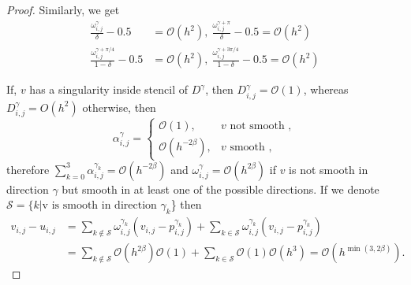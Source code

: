 \begin{proof}
Similarly, we get
$$
\begin{aligned}
\frac{\omega_{i,j}^\gamma}{\delta}-0.5&=\mathcal{O}\left(h^2\right),\:
\frac{\omega_{i,j}^{\gamma+\pi}}{\delta}-0.5=\mathcal{O}\left(h^2\right)\\
\frac{\omega_{i,j}^{\gamma+\pi/4}}{1-\delta}-0.5&=\mathcal{O}\left(h^2\right),\:
\frac{\omega_{i,j}^{\gamma+3\pi/4}}{1-\delta}-0.5=\mathcal{O}\left(h^2\right)
\end{aligned}
$$

If, $v$ has a singularity inside stencil of $D^\gamma$, then $D^{\gamma}_{i, j} =\mathcal{O}\left(1\right)$, whereas $D^{\gamma}_{i, j}=O\left(h^2\right)$ otherwise, then
$$
\alpha^{\gamma}_{i, j}= \begin{cases}\mathcal{O}(1), & v \text { not smooth }, \\ \mathcal{O}\left(h^{-2 \beta}\right), & v \text { smooth } ,\end{cases}
$$
therefore $\sum_{k=0}^{3} \alpha^{\gamma_k}_{i,j}=\mathcal{O}\left(h^{-2 \beta}\right)$ and $\omega_{i,j}^{\gamma}=\mathcal{O}\left(h^{2 \beta}\right)$ if $v$ is not smooth in direction $\gamma$ but smooth in at least one of the possible directions. If we denote $\mathcal{S}=\{k| \textrm{v is smooth in}$ $\textrm{direction }\gamma_k$\} then
$$
\begin{aligned}
	v_{i,j}-u_{i,j} & =\sum_{k\notin \mathcal{S}} \omega_{i,j}^{\gamma_k}\left(v_{i,j}-p^{\gamma_k}_{i,j}\right) +\sum_{k\in \mathcal{S}} \omega_{i,j}^{\gamma_k}\left(v_{i,j}-p^{\gamma_k}_{i,j}\right)\\
	& =\sum_{k \notin \mathcal{S}} \mathcal{O}\left(h^{2 \beta}\right) \mathcal{O}(1)+\sum_{k \in \mathcal{S}} \mathcal{O}(1) \mathcal{O}\left(h^3\right)=\mathcal{O}\left(h^{\min (3, 2 \beta)}\right) .
\end{aligned}
$$


\end{proof}

